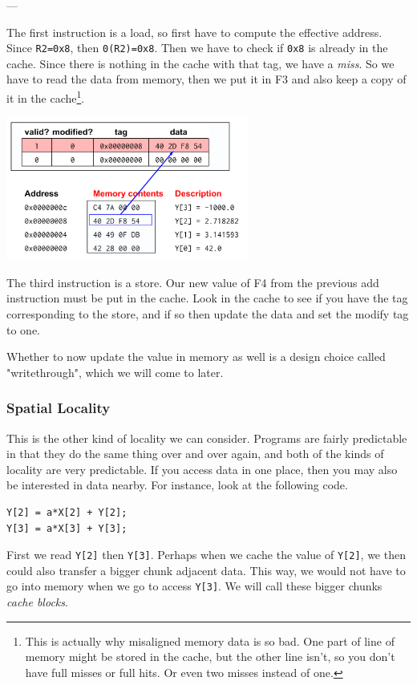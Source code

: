 \documentclass{article}
\begin{document}
---

The first instruction is a load, so first have to compute the effective address. Since \verb|R2=0x8|, then \verb|0(R2)=0x8|. Then we have to check if \verb|0x8| is already in the cache. Since there is nothing in the cache with that tag, we have a  \textit{miss}. So we have to read the data from memory, then we put it in F3 and also keep a copy of it in the cache\footnote{This is actually why misaligned memory data is so bad. One part of line of memory might be stored in the cache, but the other line isn't, so you don't have full misses or full hits. Or even two misses instead of one.}.

\includegraphics[width=80mm]{img/Update.png}

The third instruction is a store. Our new value of F4 from the previous add instruction must be put in the cache. Look in the cache to see if you have the tag corresponding to the store, and if so then update the data and set the modify tag to one.

Whether to now update the value in memory as well is a design choice called "writethrough", which we will come to later.




\subsubsection{Spatial Locality}

This is the other kind of locality we can consider. Programs are fairly predictable in that they do the same thing over and over again, and both of the kinds of locality are very predictable. If you access data in one place, then you may also be interested in data nearby. For instance, look at the following code.

\begin{verbatim}
Y[2] = a*X[2] + Y[2];
Y[3] = a*X[3] + Y[3];
\end{verbatim}

First we read \verb|Y[2]| then \verb|Y[3]|. Perhaps when we cache the value of \verb|Y[2]|, we then could also transfer a bigger chunk adjacent data. This way, we would not have to go into memory when we go to access \verb|Y[3]|. We will call these bigger chunks \textit{cache blocks}.
\end{document}
